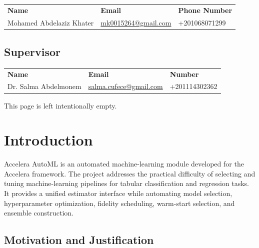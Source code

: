 \documentclass[12pt,a4paper,oneside]{report}
\newcommand{\systemname}{Accelera AutoML}
\begin{document}
\begin{tabularx}{\textwidth}{p{}X p{}}
\rowcolor{gray!35}
\textbf{Name} & \textbf{Email} & \textbf{Phone Number} \\
Mohamed Abdelaziz Khater & \href{mailto:mk0015264@gmail.com}{mk0015264@gmail.com} & +201068071299 \\
\end{tabularx}

\vspace{1.2cm}

\section*{Supervisor}

\begin{tabularx}{\textwidth}{p{}X p{}}
\rowcolor{gray!35}
\textbf{Name} & \textbf{Email} & \textbf{Number} \\
Dr. Salma Abdelmonem & \href{mailto:salma.cufece@gmail.com}{salma.cufece@gmail.com} & +201114302362 \\
\end{tabularx}

\clearpage
\thispagestyle{empty}
\vspace*{\fill}
\begin{center}
This page is left intentionally empty.
\end{center}
\vspace*{\fill}
\clearpage
{}

\chapter{Introduction}
\label{chap:introduction}

\systemname{} is an automated machine-learning module developed for the
Accelera framework. The project addresses the practical difficulty of selecting
and tuning machine-learning pipelines for tabular classification and regression
tasks. It provides a unified estimator interface while automating model
selection, hyperparameter optimization, fidelity scheduling, warm-start
selection, and ensemble construction.

\section{Motivation and Justification}
\end{document}
